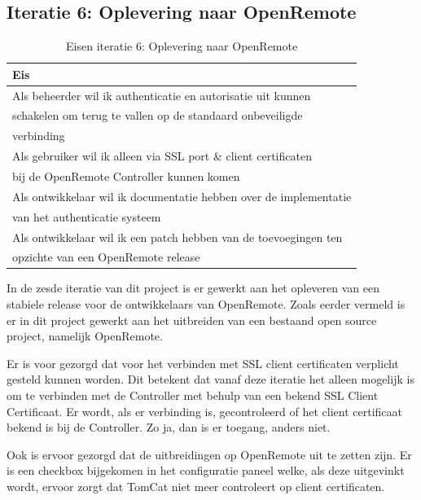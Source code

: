 \documentclass[]{article}
\begin{document}
\subsection{Iteratie 6: Oplevering naar OpenRemote}
\begin{table}[htpb]
  \caption{Eisen iteratie 6: Oplevering naar OpenRemote}
  \begin{center}
    \begin{tabular}{|| l ||}\hline
        Eis                                                              \\\hline\hline
        Als beheerder wil ik authenticatie en autorisatie uit kunnen    \\
        schakelen om terug te vallen op de standaard onbeveiligde        \\ 
        verbinding                                                       \\\hline
        Als gebruiker wil ik alleen via SSL port \& client certificaten  \\ 
        bij de OpenRemote Controller kunnen komen                        \\\hline
        Als ontwikkelaar wil ik documentatie hebben over de implementatie\\ 
        van het authenticatie systeem                                    \\\hline
        Als ontwikkelaar wil ik een patch hebben van de toevoegingen ten \\
        opzichte van een OpenRemote release                              \\\hline
    \end{tabular}
  \end{center}
\end{table}

In de zesde iteratie van dit project is er gewerkt aan het opleveren van een
stabiele release voor de ontwikkelaars van OpenRemote. Zoals eerder vermeld is
er in dit project gewerkt aan het uitbreiden van een bestaand open source
project, namelijk OpenRemote. 

Er is voor gezorgd dat voor het verbinden met SSL client certificaten verplicht
gesteld kunnen worden. Dit betekent dat vanaf deze iteratie het alleen mogelijk is
om te verbinden met de Controller met behulp van een bekend SSL Client
Certificaat. Er wordt, als er verbinding is, gecontroleerd of het client certificaat bekend
is bij de Controller. Zo ja, dan is er toegang, anders niet.

Ook is ervoor gezorgd dat de uitbreidingen op OpenRemote uit te zetten
zijn. Er is een checkbox bijgekomen in het configuratie paneel welke, als
deze uitgevinkt wordt, ervoor zorgt dat TomCat niet meer controleert op client
certificaten. 
\end{document}
